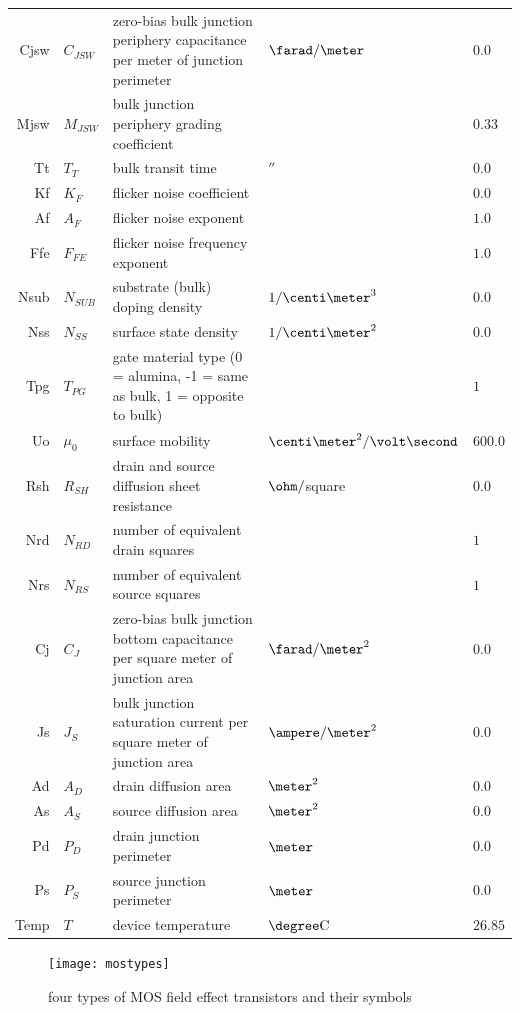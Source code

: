 \documentclass[10pt]{report}
\begin{document}
\begin{tabular}{rllll}
Cjsw & $C_{JSW}$ & \parbox[t]{6.5cm}{zero-bias bulk junction periphery capacitance per meter of junction perimeter} & $\farad/\meter$ & $0.0$\\
Mjsw & $M_{JSW}$ & bulk junction periphery grading coefficient & & $0.33$\\
Tt & $T_{T}$ & bulk transit time & $\second$ & $0.0$\\
Kf & $K_{F}$ & flicker noise coefficient & & $0.0$\\
Af & $A_{F}$ & flicker noise exponent & & $1.0$\\
Ffe & $F_{FE}$ & flicker noise frequency exponent & & $1.0$\\
Nsub & $N_{SUB}$ & substrate (bulk) doping density & $1/\centi\meter^3$ & $0.0$\\
Nss & $N_{SS}$ & surface state density & $1/\centi\meter^2$ & $0.0$\\
Tpg & $T_{PG}$ & \parbox[t]{6.5cm}{gate material type (0 = alumina, -1 = same as bulk, 1 = opposite to bulk)} &  & $1$\\
Uo & $\mu_{0}$ & surface mobility & $\centi\meter^2/\volt\second$ & $600.0$\\
Rsh & $R_{SH}$ & drain and source diffusion sheet resistance & $\ohm/$square & $0.0$\\
Nrd & $N_{RD}$ & number of equivalent drain squares & & $1$\\
Nrs & $N_{RS}$ & number of equivalent source squares & & $1$\\
Cj & $C_{J}$ & \parbox[t]{6.5cm}{zero-bias bulk junction bottom capacitance per square meter of junction area} & $\farad/\meter^2$ & $0.0$\\
Js & $J_{S}$ & \parbox[t]{6.5cm}{bulk junction saturation current per square meter of junction area} & $\ampere/\meter^2$ & $0.0$\\
Ad & $A_{D}$ & drain diffusion area & $\meter^2$ & $0.0$\\
As & $A_{S}$ & source diffusion area & $\meter^2$ & $0.0$\\
Pd & $P_{D}$ & drain junction perimeter & $\meter$ & $0.0$\\
Ps & $P_{S}$ & source junction perimeter & $\meter$ & $0.0$\\
Temp & $T$ & device temperature & $\degree \mathrm{C}$ & $26.85$
\end{tabular}

\begin{figure}[ht]
\begin{center}
\texttt{[image: mostypes]}
\end{center}
\caption{four types of MOS field effect transistors and their symbols}
\label{fig:MOStypes}
\end{figure}
\FloatBarrier
\end{document}
